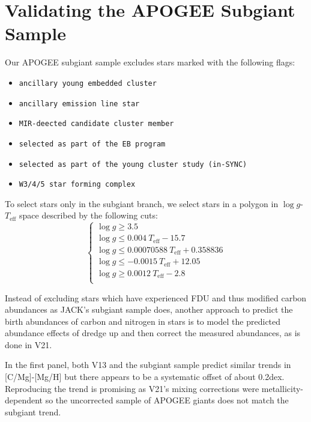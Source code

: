 \documentclass[fleqn,usenatbib]{mnras}
\begin{document}


\appendix

\section{Validating the APOGEE Subgiant Sample}\label{sec:jack}
Our APOGEE subgiant sample excludes stars marked with the following flags:
\begin{itemize}
\item \texttt{ancillary young embedded cluster}
\item \texttt{ancillary emission line star}
\item \texttt{MIR-deected candidate cluster member}
\item \texttt{selected as part of the EB program}
\item \texttt{selected as part of the young cluster study (in-SYNC)}
\item \texttt{W3/4/5 star forming complex}
\end{itemize}

To select stars only in the subgiant branch, we select stars in a polygon in $\log g$-$T_\text{eff}$ space described by the following cuts:
\begin{equation}
\begin{cases}
\log g \geq 3.5 \\
\log g \leq 0.004\ T_\text{eff} - 15.7 \\
\log g \leq 0.00070588\ T_\text{eff} + 0.358836 \\
\log g \leq -0.0015\ T_\text{eff} + 12.05 \\
\log g \geq 0.0012\ T_\text{eff} - 2.8 \\
\end{cases}
\end{equation}

Instead of excluding stars which have experienced FDU and thus modified carbon abundances as JACK's subgiant sample does, another approach to predict the birth abundances of carbon and nitrogen in stars is to model the predicted abundance effects of dredge up and then correct the measured abundances, as is done in V21. 

In the first panel, both V13 and the subgiant sample predict similar trends in [C/Mg]-[Mg/H] but there appears to be a systematic offset of about 0.2dex. Reproducing the trend is promising as V21's mixing corrections were metallicity-dependent so the uncorrected sample of APOGEE giants does not match the subgiant trend. 
\end{document}

